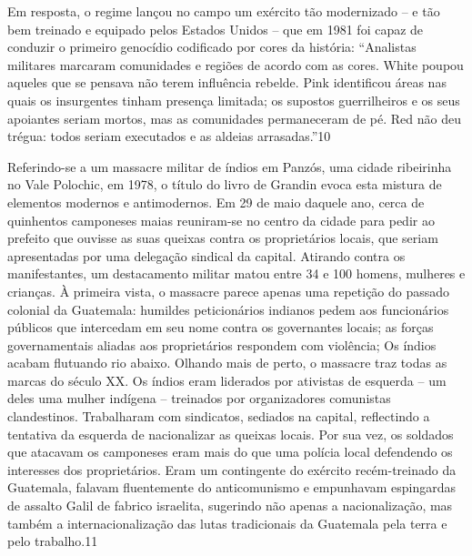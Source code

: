  \par 
Em resposta, o regime lançou no campo um exército tão modernizado – e tão bem treinado e equipado pelos Estados Unidos – que em 1981 foi capaz de conduzir o primeiro genocídio codificado por cores da história: “Analistas militares marcaram comunidades e regiões de acordo com as cores. White poupou aqueles que se pensava não terem influência rebelde. Pink identificou áreas nas quais os insurgentes tinham presença limitada; os supostos guerrilheiros e os seus apoiantes seriam mortos, mas as comunidades permaneceram de pé. Red não deu trégua: todos seriam executados e as aldeias arrasadas.”{\color{blue}10}
 \par 
Referindo-se a um massacre militar de índios em Panzós, uma cidade ribeirinha no Vale Polochic, em 1978, o título do livro de Grandin evoca esta mistura de elementos modernos e antimodernos. Em {\color{blue}29} de maio daquele ano, cerca de quinhentos camponeses maias reuniram-se no centro da cidade para pedir ao prefeito que ouvisse as suas queixas contra os proprietários locais, que seriam apresentadas por uma delegação sindical da capital. Atirando contra os manifestantes, um destacamento militar matou entre {\color{blue}34} e {\color{blue}100} homens, mulheres e crianças. À primeira vista, o massacre parece apenas uma repetição do passado colonial da Guatemala: humildes peticionários indianos pedem aos funcionários públicos que intercedam em seu nome contra os governantes locais; as forças governamentais aliadas aos proprietários respondem com violência; Os índios acabam flutuando rio abaixo. Olhando mais de perto, o massacre traz todas as marcas do século XX. Os índios eram liderados por ativistas de esquerda – um deles uma mulher indígena – treinados por organizadores comunistas clandestinos. Trabalharam com sindicatos, sediados na capital, reflectindo a tentativa da esquerda de nacionalizar as queixas locais. Por sua vez, os soldados que atacavam os camponeses eram mais do que uma polícia local defendendo os interesses dos proprietários. Eram um contingente do exército recém-treinado da Guatemala, falavam fluentemente do anticomunismo e empunhavam espingardas de assalto Galil de fabrico israelita, sugerindo não apenas a nacionalização, mas também a internacionalização das lutas tradicionais da Guatemala pela terra e pelo trabalho.{\color{blue}11}
 \par 
